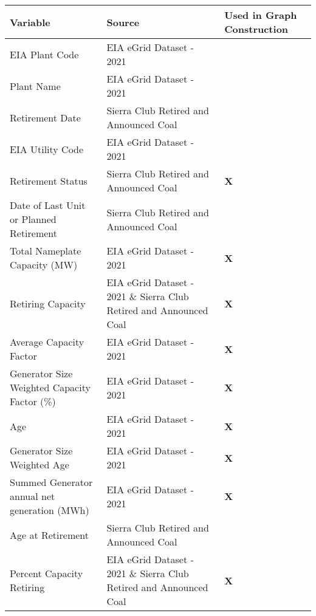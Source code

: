 
\begin{table}[H]
    \centering
    \small
    \begin{adjustbox}{width=\textwidth}
      \begin{tabular}{|l | l | l |}
        \toprule
        \textbf{Variable} & \textbf{Source} & \textbf{Used in Graph Construction} \\
        \midrule\midrule
        EIA Plant Code & EIA eGrid Dataset - 2021 & \\
        \midrule
        Plant Name & EIA eGrid Dataset - 2021 & \\
        \midrule
        Retirement Date & Sierra Club Retired and Announced Coal & \\
        \midrule
        EIA Utility Code & EIA eGrid Dataset - 2021 & \\
        \midrule
        Retirement Status & Sierra Club Retired and Announced Coal & \textbf{X} \\
        \midrule
        Date of Last Unit or Planned Retirement & Sierra Club Retired and Announced Coal & \\
        \midrule
        Total Nameplate Capacity (MW) & EIA eGrid Dataset - 2021 & \textbf{X} \\
        \midrule
        Retiring Capacity & EIA eGrid Dataset - 2021 \& Sierra Club Retired and Announced Coal & \textbf{X} \\
        \midrule
        Average Capacity Factor & EIA eGrid Dataset - 2021 & \textbf{X} \\
        \midrule
        Generator Size Weighted Capacity Factor (\%) & EIA eGrid Dataset - 2021 & \textbf{X} \\
        \midrule
        Age & EIA eGrid Dataset - 2021 & \textbf{X} \\
        \midrule
        Generator Size Weighted Age & EIA eGrid Dataset - 2021 & \textbf{X} \\
        \midrule
        Summed Generator annual net generation (MWh) & EIA eGrid Dataset - 2021 & \textbf{X} \\
        \midrule
        Age at Retirement & Sierra Club Retired and Announced Coal & \\
        \midrule
        Percent Capacity Retiring & EIA eGrid Dataset - 2021 \& Sierra Club Retired and Announced Coal & \textbf{X} \\

\end{tabular}
\end{adjustbox}
\end{table}
